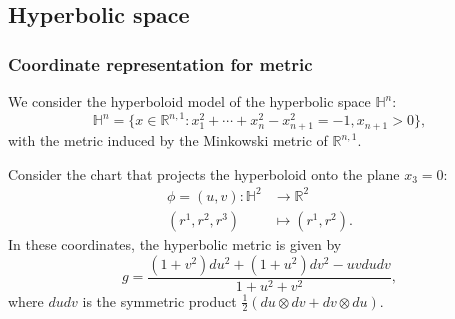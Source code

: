 \documentclass{report}
\begin{document}
\subsection{Hyperbolic space}
\subsubsection{Coordinate representation for metric}
    We consider the hyperboloid model of the hyperbolic space $\mathbb H^n$:
    \[
    \mathbb H^n = \{x \in \mathbb R^{n,1}: x_1^2 + \cdots + x_n^2 - x_{n+1}^2 = -1, x_{n+1} > 0\},
    \]
    with the metric induced by the Minkowski metric of $\mathbb R^{n,1}$.
    
    \begin{proposition}
        Consider the chart that projects the hyperboloid onto the plane $x_{3} = 0$:
        \begin{align*}
            \phi = (u,v): \mathbb H^2 &\to \mathbb R^2\\
            (r^1, r^2, r^3) &\mapsto (r^1, r^2).
        \end{align*}
    In these coordinates, the hyperbolic metric is given by
    \[
    g = \frac{(1 + v^2) du^2 + (1 + u^2) dv^2 - uv du dv}{1 + u^2 + v^2},
    \]
    where $du dv$ is the symmetric product $\frac{1}{2}(du \otimes dv + dv \otimes du)$.
    \end{proposition}
\end{document}

